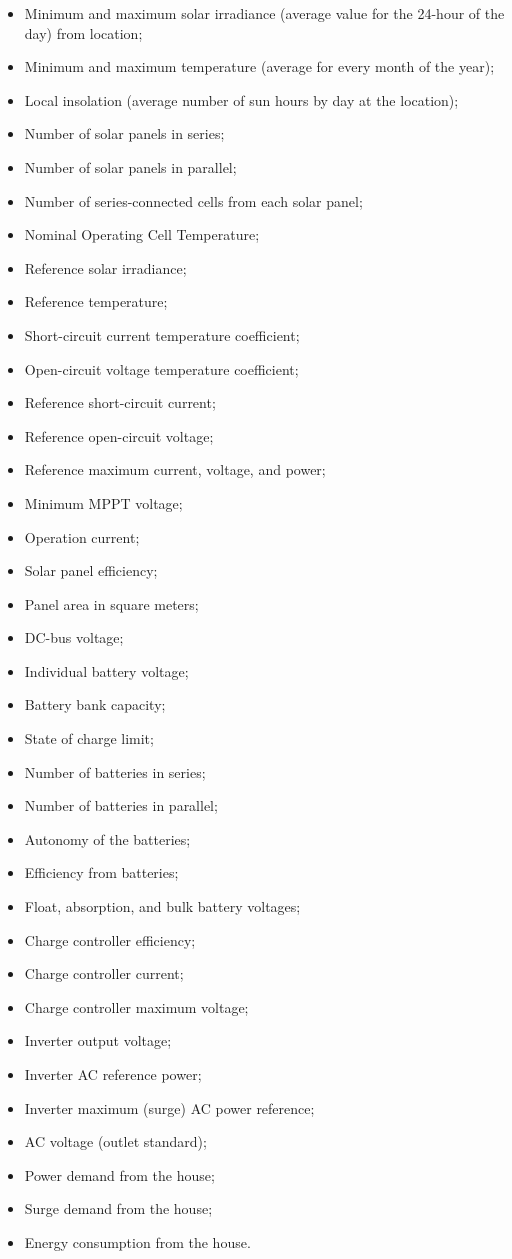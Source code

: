 \begin{itemize}
\item Minimum and maximum solar irradiance (average value for the 24-hour of the day) from location;
\item Minimum and maximum temperature (average for every month of the year);
\item Local insolation (average number of sun hours by day at the location);
\item Number of solar panels in series;
\item Number of solar panels in parallel;
\item Number of series-connected cells from each solar panel;
\item Nominal Operating Cell Temperature;
\item Reference solar irradiance;
\item Reference temperature;
\item Short-circuit current temperature coefficient;
\item Open-circuit voltage temperature coefficient;
\item Reference short-circuit current;
\item Reference open-circuit voltage;
\item Reference maximum current, voltage, and power;
\item Minimum MPPT voltage;
\item Operation current;
\item Solar panel efficiency;
\item Panel area in square meters;
\item DC-bus voltage;
\item Individual battery voltage;
\item Battery bank capacity;
\item State of charge limit;
\item Number of batteries in series;
\item Number of batteries in parallel;
\item Autonomy of the batteries;
\item Efficiency from batteries;
\item Float, absorption, and bulk battery voltages;
\item Charge controller efficiency;
\item Charge controller current;
\item Charge controller maximum voltage;
\item Inverter output voltage;
\item Inverter AC reference power;
\item Inverter maximum (surge) AC power reference;
\item AC voltage (outlet standard);
\item Power demand from the house;
\item Surge demand from the house;
\item Energy consumption from the house.
\end{itemize}

